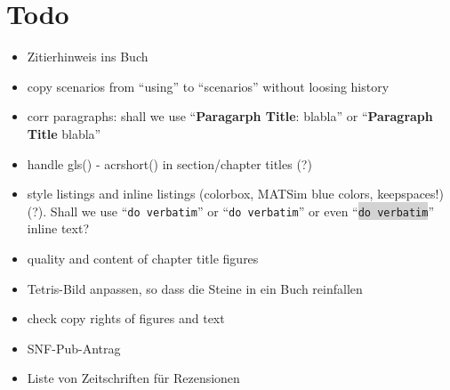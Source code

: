 \section*{Todo}

\begin{itemize}\styleItemize

\item Zitierhinweis ins Buch

\item copy scenarios from ``using'' to ``scenarios'' without loosing history

\item corr paragraphs: shall we use ``\textbf{Paragarph Title}: blabla'' or ``\textbf{Paragraph Title} blabla''

\item handle gls() - acrshort() in section/chapter titles (?)

\item style listings and inline listings (colorbox, MATSim blue colors, keepspaces!) (?). Shall we use ``\verb|do verbatim|'' or ``\lstinline|do verbatim|'' or even ``\colorbox{lightgray}{\lstinline|do verbatim|}'' inline text?

\item quality and content of chapter title figures

\item Tetris-Bild anpassen, so dass die Steine in ein Buch reinfallen

\item check copy rights of figures and text

\item SNF-Pub-Antrag

\item Liste von Zeitschriften für Rezensionen








\end{itemize}



